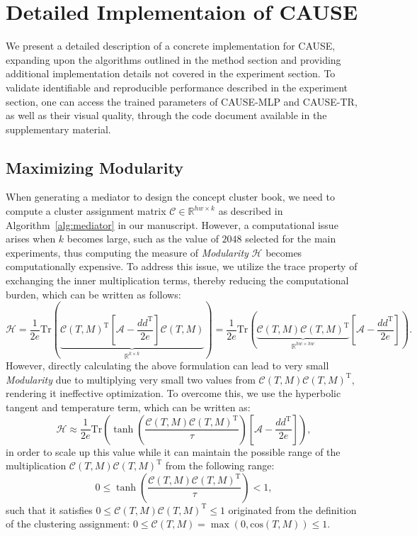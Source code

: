 \documentclass{article} \usepackage{iclr2024_conference,times}
\begin{document}
\section{Detailed Implementaion of CAUSE}
\label{appendix:B}
We present a detailed description of a concrete implementation for CAUSE, expanding upon the algorithms outlined in the method section and providing additional implementation details not covered in the experiment section. To validate identifiable and reproducible performance described in the experiment section, one can access the trained parameters of CAUSE-MLP and CAUSE-TR, as well as their visual quality, through the code document available in the supplementary material.


\subsection{Maximizing Modularity}

When generating a mediator to design the concept cluster book, we need to compute a cluster assignment matrix $\mathcal{C}\in\mathbb{R}^{hw\times k}$ as described in Algorithm~\ref{alg:mediator} in our manuscript. However, a computational issue arises when $k$ becomes large, such as the value of $2048$ selected for the main experiments, thus computing the measure of \textit{Modularity} $\mathcal{H}$ becomes computationally expensive. To address this issue, we utilize the trace property of exchanging the inner multiplication terms, thereby reducing the computational burden, which can be written as follows:
\begin{equation}
    \mathcal{H} = \frac{1}{2e}\text{Tr}\left(\underbrace{\mathcal{C}(T, M)^\text{T}\left[\mathcal{A}-\frac{dd^\text{T}}{2e}\right]\mathcal{C}(T, M)}_{\mathbb{R}^{k\times k}}\right) = \frac{1}{2e}\text{Tr}\left(\underbrace{\mathcal{C}(T, M)\mathcal{C}(T, M)^\text{T}}_{\mathbb{R}^{hw \times hw}}\left[\mathcal{A}-\frac{dd^\text{T}}{2e}\right]\right).
\end{equation}
However, directly calculating the above formulation can lead to very small \textit{Modularity} due to multiplying very small two values from $\mathcal{C}(T, M)\mathcal{C}(T, M)^\text{T}$, rendering it ineffective optimization. To overcome this, we use the hyperbolic tangent and temperature term, which can be written as:
\begin{equation}
\mathcal{H} \approx \frac{1}{2e}\text{Tr}\left(\tanh\left(\frac{\mathcal{C}(T, M)\mathcal{C}(T, M)^\text{T}}{\tau}\right)\left[\mathcal{A}-\frac{dd^\text{T}}{2e}\right]\right),
\end{equation}
in order to scale up this value while it can maintain the possible range of the multiplication $\mathcal{C}(T, M)\mathcal{C}(T, M)^\text{T}$ from the following range:
\begin{equation}
    0\leq \tanh\left(\frac{\mathcal{C}(T, M)\mathcal{C}(T, M)^\text{T}}{\tau}\right)<1,
\end{equation}
such that it satisfies $0\leq \mathcal{C}(T, M)\mathcal{C}(T, M)^\text{T}\leq 1$ originated from the definition of the clustering assignment: $0\leq\mathcal{C}(T, M)=\max(0, \text{cos}(T, M))\leq 1$.
\end{document}
